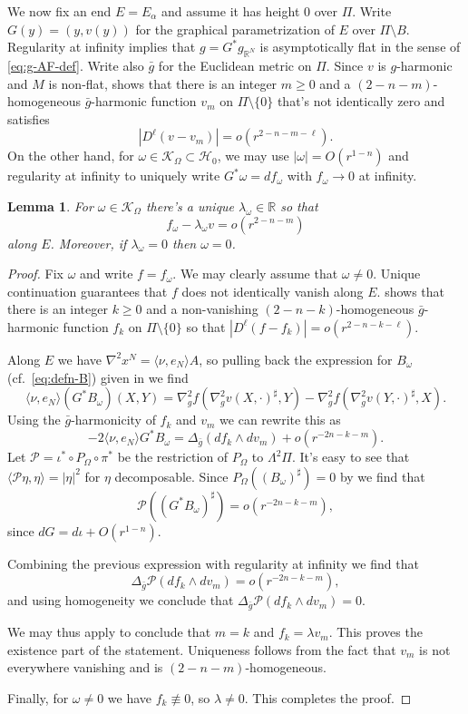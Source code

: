 \documentclass[11pt]{amsart}
\numberwithin{equation}{section}
\theoremstyle{plain}
\newtheorem{lemma}[lemma]{Lemma}
\theoremstyle{definition}
\theoremstyle{remark}
\newcommand{\R}{\mathbb{R}}
\newcommand{\Hcal}{\mathcal H}
\newcommand{\Kcal}{\mathcal K}
\newcommand{\Pscr}{\mathscr{P}}
\newcommand{\bangle}[1]{\langle #1 \rangle}
\begin{document}
We now fix an end $E=E_\alpha$ and assume it has height $0$ over $\Pi$. Write $G(y)=(y,v(y))$ for the graphical parametrization of $E$ over $\Pi\setminus B$. Regularity at infinity implies that $g=G^*g_{\R^N}$ is asymptotically flat in the sense of \eqref{eq:g-AF-def}. Write also $\bar g$ for the Euclidean metric on $\Pi$. Since $v$ is $g$-harmonic and $M$ is non-flat,  shows that there is an integer $m\geq 0$ and a $(2-n-m)$-homogeneous $\bar g$-harmonic function $v_m$ on $\Pi\setminus\{0\}$ that's not identically zero and satisfies
\[
|D^\ell (v-v_m)| = o(r^{2-n-m-\ell}). 
\]
On the other hand, for $\omega \in \Kcal_\Omega \subset \Hcal_0$, we may use $|\omega| = O(r^{1-n})$ and regularity at infinity to uniquely write $G^*\omega = df_\omega$ with $f_\omega \to0$ at infinity. 

\begin{lemma}\label{lemm:lambda-omega}
For $\omega\in\Kcal_\Omega$ there's a unique $\lambda_\omega \in \R$ so that
\[
f_\omega - \lambda_\omega v = o(r^{2-n-m}) 
\]
along $E$. Moreover, if $\lambda_\omega = 0$ then $\omega = 0$. 
\end{lemma}
\begin{proof}
Fix $\omega$ and write $f=f_\omega$. We may clearly assume that $\omega \neq 0$. Unique continuation guarantees that $f$ does not identically vanish along $E$.  shows that there is an integer $k\geq 0$ and a non-vanishing $(2-n-k)$-homogeneous $\bar g$-harmonic function $f_k$ on $\Pi\setminus\{0\}$ so that $|D^\ell (f-f_k)| = o(r^{2-n-k-\ell})$. 

Along $E$ we have $\nabla^2 x^N = \bangle{\nu,e_N} A$, so pulling back the expression for $B_\omega$ (cf.\ \eqref{eq:defn-B}) given in  we find
\[
\bangle{\nu,e_N} (G^*B_\omega)(X,Y) = \nabla^2_g f(\nabla_g^2v(X,\cdot)^\sharp,Y) - \nabla^2_g f(\nabla_g^2v(Y,\cdot)^\sharp,X) .
\]
Using the $\bar g$-harmonicity of $f_k$ and $v_m$ we can rewrite this as 
\[
-2 \bangle{\nu,e_N} G^*B_\omega = \Delta_{\bar g} (df_k \wedge dv_m) + o(r^{-2n-k-m}).
\]
Let $\Pscr = \iota^* \circ P_\Omega \circ \pi^*$ be the restriction of $P_\Omega$ to $\Lambda^2\Pi$. It's easy to see that $\bangle{\Pscr\eta,\eta} = |\eta|^2$ for $\eta$ decomposable. Since $P_\Omega((B_\omega)^\sharp) = 0$ by  we find that 
\[
\Pscr((G^*B_\omega)^\sharp) = o(r^{-2n-k-m}),
\]
since $dG = d\iota + O(r^{1-n})$. 

Combining the previous expression with regularity at infinity we find that
\[
\Delta_{\bar g} \Pscr (df_k\wedge dv_m) = o(r^{-2n-k-m}),
\]
and using homogeneity we conclude that $\Delta_{\bar g} \Pscr (df_k\wedge dv_m)=0$. 

We may thus apply  to conclude that $m=k$ and $f_k = \lambda v_m$. This proves the existence part of the statement. Uniqueness follows from the fact that $v_m$ is not everywhere vanishing and is $(2-n-m)$-homogeneous. 

Finally, for $\omega \neq 0$ we have $f_k \not\equiv 0$, so $\lambda\neq 0$. This completes the proof.
\end{proof}
\end{document}
